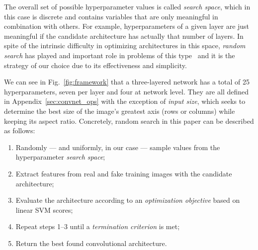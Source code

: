 



The overall set of possible hyperparameter values is called \emph{search space}, which in this case is discrete and contains variables that are only meaningful in combination with others. For example, hyperparameters of a given layer are just meaningful if the candidate architecture has actually that number of layers.
In spite of the intrinsic difficulty in optimizing architectures in this space, \emph{random search} has played and important role in problems of this type~\cite{Pinto:2009,Bergstra:2012} and it is the strategy of our choice due to its effectiveness and simplicity.

We can see in Fig.~\ref{fig:framework} that a three-layered network has a total of 25 hyperparameters, seven per layer and four at network level. They are all defined in Appendix~\ref{sec:convnet_ops} with the exception of \emph{input size}, which seeks to determine the best size of the image's greatest axis (rows or columns) while keeping its aspect ratio. Concretely, random search in this paper can be described as follows:

\begin{enumerate}
\item Randomly --- and uniformly, in our case --- sample values from the hyperparameter \emph{search space};
\item Extract features from real and fake training images with the candidate architecture;
\item Evaluate the architecture according to an \emph{optimization objective} based on linear SVM scores;
\item Repeat steps 1--3 until a \emph{termination criterion} is met;
\item Return the best found convolutional architecture.
\\
\end{enumerate}



